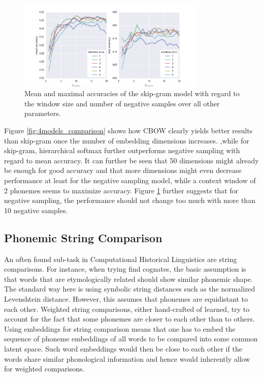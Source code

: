 \documentclass[11pt]{article}
\begin{document}
\begin{figure}[h] %
   \centering
   \includegraphics[width=0.8\textwidth]{acc_k_neg_vs_windowSize} 
   \caption{Mean and maximal accuracies of the skip-gram model with regard to the window size and number of negative samples over all other parameters.}
   \label{fig:acc_k_neg_vs_windowSize}
\end{figure}

Figure \ref{fig:4models_comparison} shows how CBOW clearly yields better results than skip-gram once the number of embedding dimensions increases. ,while for skip-gram, hierarchical softmax further outperforms negative sampling with regard to mean accuracy. It can further be seen that 50 dimensions might already be enough for good accuracy and that more dimensions might even decrease performance at least for the negative sampling model, while a context window of 2 phonemes seems to maximize accuracy. Figure \ref{fig:acc_k_neg_vs_windowSize} further suggests that for negative sampling, the performance should not change too much with more than 10 negative samples.

\subsection{Phonemic String Comparison}
An often found sub-task in Computational Historical Linguistics are string comparisons. For instance, when trying find cognates, the basic assumption is that words that are etymologically related should show similar phonemic shape. The standard way here is using symbolic string distances such as the normalized Levenshtein distance. However, this assumes that phonemes are equidistant to each other. Weighted string comparisons, either hand-crafted of learned, try to account for the fact that some phonemes are closer to each other than to others. 
Using embeddings for string comparison means that one has to embed the sequence of phoneme embeddings of all words to be compared into some common latent space. Such word embeddings would then be close to each other if the words share similar phonological information and hence would inherently allow for weighted comparisons. 
\end{document}
